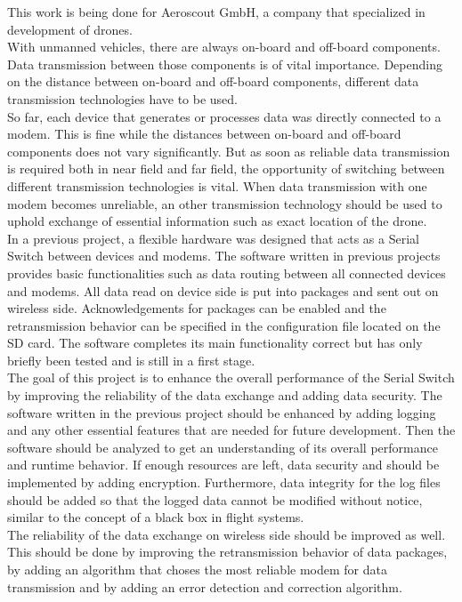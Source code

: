 %
This work is being done for Aeroscout GmbH, a company that specialized in development of drones. \\
With unmanned vehicles, there are always on-board and off-board components. Data transmission between those components is of vital importance. Depending on the distance between on-board and off-board components, different data transmission technologies have to be used. \\
So far, each device that generates or processes data was directly connected to a modem. This is fine while the distances between on-board and off-board components does not vary significantly. But as soon as reliable data transmission is required both in near field and far field, the opportunity of switching between different transmission technologies is vital. When data transmission with one modem becomes unreliable, an other transmission technology should be used to uphold exchange of essential information such as exact location of the drone.\\
In a previous project, a flexible hardware was designed that acts as a Serial Switch between devices and modems. The software written in previous projects provides basic functionalities such as data routing between all connected devices and modems. All data read on device side is put into packages and sent out on wireless side. Acknowledgements for packages can be enabled and the retransmission behavior can be specified in the configuration file located on the SD card. The software completes its main functionality correct but has only briefly been tested and is still in a first stage.\\
The goal of this project is to enhance the overall performance of the Serial Switch by improving the reliability of the data exchange and adding data security. The software written in the previous project should be enhanced by adding logging and any other essential features that are needed for future development. Then the software should be analyzed to get an understanding of its overall performance and runtime behavior. If enough resources are left, data security and should be implemented by adding encryption. Furthermore, data integrity for the log files should be added so that the logged data cannot be modified without notice, similar to the concept of a black box in flight systems.\\
The reliability of the data exchange on wireless side should be improved as well. This should be done by improving the retransmission behavior of data packages, by adding an algorithm that choses the most reliable modem for data transmission and by adding an error detection and correction algorithm.\\ \\
